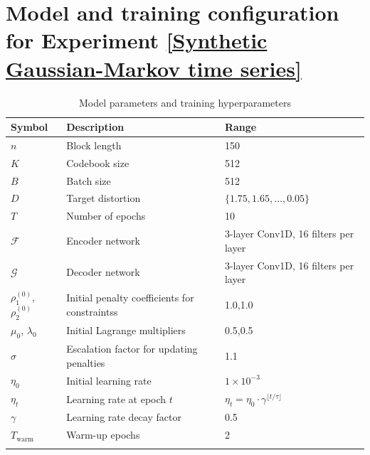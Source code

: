 \documentclass[12pt,review,authoryear]{elsarticle}
\theoremstyle{upright}
\begin{document}
\section{  Model and training configuration for Experiment \ref{Synthetic Gaussian-Markov time series}}
\label{Model and training configuration for Experiment 1}
\begin{table}[H]
\centering
\caption{Model parameters and training hyperparameters}
\begin{tabular}{lll}
\toprule
\textbf{Symbol} & \textbf{Description} & \textbf{Range} \\
\midrule
\(n\) & Block length & 150 \\
\(K\) & Codebook size & 512 \\
\(B\) & Batch size & 512 \\
\(D\) & Target distortion & \(\{1.75, 1.65, \dots, 0.05\}\)  \\
\(T\) & Number of epochs & 10 \\
\(\mathcal{F}\) & Encoder network & 3-layer Conv1D, 16 filters per layer \\
\(\mathcal{G}\) & Decoder network & 3-layer Conv1D, 16 filters per layer \\
\(\rho_1^{(0)}\), \(\rho_2^{(0)}\) & Initial penalty coefficients for constraintss & 1.0,1.0 \\
\(\mu_0\), \(\lambda_0\) & Initial Lagrange multipliers& 0.5,0.5 \\
\(\sigma\) & Escalation factor for updating penalties & 1.1 \\
\(\eta_0\) & Initial learning rate & \(1 \times 10^{-3}\) \\
\(\eta_t\) & Learning rate at epoch \(t\) & \(\eta_t = \eta_0 \cdot \gamma^{\lfloor t / \tau \rfloor}\) \\
\(\gamma\) & Learning rate decay factor & 0.5 \\

\(T_{\text{warm}}\) & Warm-up epochs & 2 \\
 \\

\bottomrule
\end{tabular}
\label{tab:hyperparams}
\end{table}
\end{document}

